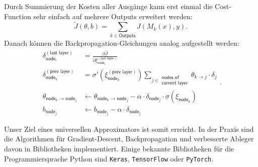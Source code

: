 Durch Summierung der Kosten aller Ausgänge kann erst einmal die Cost-Function sehr einfach
auf mehrere Outputs erweitert werden:
\[
    \tilde J(\theta, b) = \sum_{k\in \textsf{Outputs}} J(M_k(x), y).
\]
Danach können die Backpropagation-Gleichungen analog aufgestellt werden:
\begin{equation}
\begin{aligned}
    \delta_{\textsf{node}_i}^{(\textsf{last layer})} &=
        \frac{\partial \tilde J}{\partial \xi_{\textsf{node}_i}^{(\textsf{last layer})}} \\
    \delta_{\textsf{node}_k}^{(\textsf{prev layer})} &=
        \sigma' \left( \xi_{\textsf{node}_k}^{(\textsf{prev layer})} \right) 
        \sum_{j\in \substack{\textsf{nodes of}\\\textsf{current layer}}}
        \theta_{k\rightarrow j} \cdot \delta_j\\
    \theta_{\textsf{node}_k\rightarrow\textsf{node}_j} &\leftarrow
        \theta_{\textsf{node}_k\rightarrow\textsf{node}_j} -
        \alpha \cdot \delta_{\textsf{node}_j} \cdot \sigma(\xi_{\textsf{node}_k}) \\
    b_{\textsf{node}_j} &\leftarrow b_{\textsf{node}_j} - \alpha \cdot \delta_{\textsf{node}_j}
\end{aligned}.
\label{ml:ann:bp:update}
\end{equation}

\bigskip
Unser Ziel eines universellen Approximators ist somit erreicht. In der Praxis sind die
Algorithmen für Gradient-Descent, Backpropagation und verbesserte Ableger davon in
Bibliotheken implementiert. Einige bekannte Bibliotheken für die Programmiersprache Python
sind \texttt{Keras}, \texttt{TensorFlow} oder \texttt{PyTorch}.